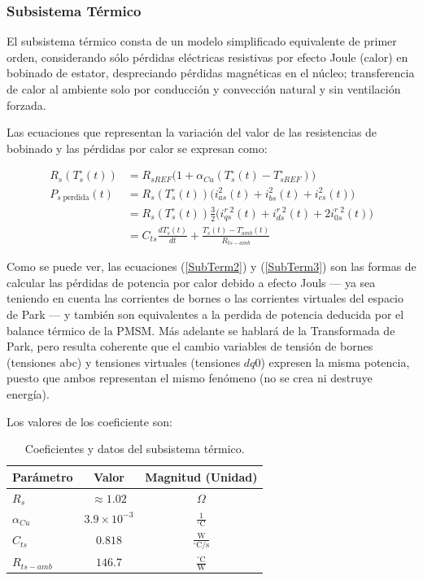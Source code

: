\documentclass[blue,fullpaper]{ludusofficial}  %
\begin{document}
\subsubsection{Subsistema Térmico}
El subsistema térmico consta de un modelo simplificado equivalente de primer orden, considerando sólo pérdidas eléctricas resistivas por efecto Joule (calor) en bobinado de estator, despreciando pérdidas magnéticas en el núcleo; transferencia de calor al ambiente solo por conducción y convección natural y sin ventilación forzada.

Las ecuaciones que representan la variación del valor de las resistencias de bobinado y las pérdidas por calor se expresan como:

\begin{align}
    R_{s}(T_{s}^{\circ}(t)) & = R_{sREF} \Big(1 + \alpha_{Cu} (T_{s}^{\circ}(t) - T_{sREF}^{\circ}) \Big) \label{SubTerm1}\\
    P_{s \; \text{perdida}}(t)  & = R_{s}(T_{s}^{\circ}(t)) \Big( i_{as}^{2}(t) + i_{bs}^{2}(t) + i_{cs}^{2}(t) \Big) \\
     & = R_{s}(T_{s}^{\circ}(t)) \frac{3}{2} \Big( i_{qs}^{r\;2}(t) + i_{ds}^{r\;2}(t) + 2i_{0s}^{r\;2}(t) \Big) \\
     & = C_{ts} \frac{dT_{s}^{\circ}(t)}{dt} +  \frac{T_{s}^{\circ}(t) - T_{amb}^{\circ}(t)}{R_{ts-amb}}
\end{align}

Como se puede ver, las ecuaciones (\ref{SubTerm2}) y (\ref{SubTerm3}) son las formas de calcular las pérdidas de potencia por calor debido a efecto Jouls — ya sea teniendo en cuenta las corrientes de bornes o las corrientes virtuales del espacio de Park — y también son equivalentes a la perdida de potencia deducida por el balance térmico de la PMSM. Más adelante se hablará de la Transformada de Park, pero resulta coherente que el cambio variables de tensión de bornes (tensiones abc) y tensiones virtuales (tensiones $dq0$) expresen la misma potencia, puesto que ambos representan el mismo fenómeno (no se crea ni destruye energía).

Los valores de los coeficiente son:

\begin{table}[htbp]
    \centering
    \caption{Coeficientes y datos del subsistema térmico.}
    \label{tab:parametros_carga}
    \begin{tabular}{lcc}
        \hline
        \textbf{Parámetro} & \textbf{Valor} & \textbf{Magnitud (Unidad)} \\
        \hline
        $R_s$ & $\approx 1.02$ & $\Omega$ \\
        $\alpha_{Cu}$ & $3.9 \times 10^{-3}$ & $\mathrm{\frac{1}{{}^\circ C}}$ \\
        $C_{ts}$ & $0.818$ & $\mathrm{\frac{W}{{}^\circ C/s}}$ \\
        $R_{ts-amb}$ & $146.7$ & $\mathrm{\frac{{}^\circ C}{W}}$ \\
        \hline
    \end{tabular}
\end{table}
\end{document}
